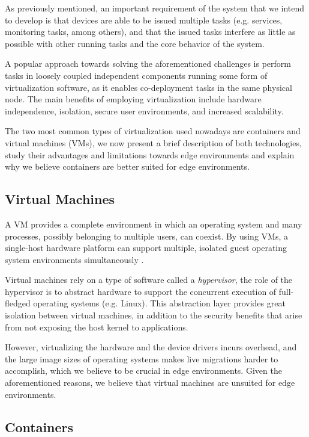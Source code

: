 
As previously mentioned, an important requirement of the system that we intend to develop is that devices are able to be issued multiple tasks (e.g. services, monitoring tasks, among others), and that the issued tasks interfere as little as possible with other running tasks and the core behavior of the system.

A popular approach towards solving the aforementioned challenges is perform tasks in loosely coupled independent components running some form of virtualization software, as it enables co-deployment tasks in the same physical node. The main benefits of employing virtualization include hardware independence, isolation, secure user environments, and increased scalability. 

The two most common types of virtualization used nowadays are containers and virtual machines (VMs), we now present a brief description of both technologies, study their advantages and limitations towards edge environments and explain why we believe containers are better suited for edge environments. 

\subsection{Virtual Machines}

A VM provides a complete environment in which an operating system and many processes, possibly belonging to multiple users, can coexist. By using VMs, a single-host hardware platform can support multiple, isolated guest operating system environments simultaneously \cite{1430629}. 

Virtual machines rely on a type of software called a \textit{hypervisor}, the role of the hypervisor is to abstract hardware to support the concurrent execution of full-fledged operating systems (e.g. Linux). This abstraction layer provides great isolation between virtual machines, in addition to the security benefits that arise from not exposing the host kernel to applications. 

However, virtualizing the hardware and the device drivers incurs overhead, and the large image sizes of operating systems makes live migrations harder to accomplish, which we believe to be crucial in edge environments. Given the aforementioned reasons, we believe that virtual machines are unsuited for edge environments.

\subsection{Containers}

